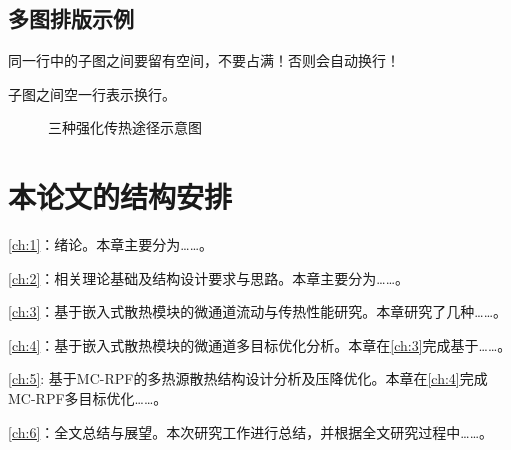\subsection{多图排版示例}
同一行中的子图之间要留有空间，不要占满！否则会自动换行！

子图之间空一行表示换行。

\begin{figure}[htb]

    \caption{三种强化传热途径示意图}
    \label{fig:Three-enhanced-heat-transfer-paths}
\end{figure}


\section{本论文的结构安排}
\cref{ch:1}：绪论。本章主要分为……。

\cref{ch:2}：相关理论基础及结构设计要求与思路。本章主要分为……。

\cref{ch:3}：基于嵌入式散热模块的微通道流动与传热性能研究。本章研究了几种……。

\cref{ch:4}：基于嵌入式散热模块的微通道多目标优化分析。本章在\cref{ch:3}完成基于……。

\cref{ch:5}: 基于MC-RPF的多热源散热结构设计分析及压降优化。本章在\cref{ch:4}完成MC-RPF多目标优化……。

\cref{ch:6}：全文总结与展望。本次研究工作进行总结，并根据全文研究过程中……。


